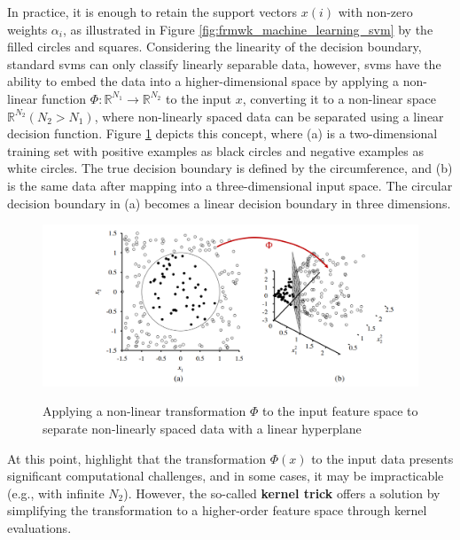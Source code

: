 In practice, it is enough to retain the support vectors $x(i)$ with non-zero weights $\alpha_i$, as illustrated in Figure \ref{fig:frmwk_machine_learning_svm} by the filled circles and squares. Considering the linearity of the decision boundary, standard \gls{svm}s can only classify linearly separable data, however, \gls{svm}s have the ability to embed the data into a higher-dimensional space by applying a non-linear function $\Phi: \mathbb{R}^{N_1} \rightarrow \mathbb{R}^{N_2}$ to the input $x$, converting it to a non-linear space $\mathbb{R}^{N_2} (N_2 > N_1)$, where non-linearly spaced data can be separated using a linear decision function. Figure \ref{fig:frmwk_machine_learning_svm_kernel_trick} depicts this concept, where (a) is a two-dimensional training set with positive examples as black circles and negative examples as white circles. The true decision boundary is defined by the circumference, and (b) is the same data after mapping into a three-dimensional input space. The circular decision boundary in (a) becomes a linear decision boundary in three dimensions.

\begin{figure}[htbp]
    \raggedright
        \caption{Applying a non-linear transformation $\Phi$ to the input feature space to separate non-linearly spaced data with a linear hyperplane}
        \includegraphics[width=1\textwidth]{resources/images/030-theoretical_framework/Framework_machine_learning_SVM_kernel_trick.png}
        \label{fig:frmwk_machine_learning_svm_kernel_trick}
\end{figure}

At this point, \textcite{Russel2010} highlight that the transformation $\Phi(x)$ to the input data presents significant computational challenges, and in some cases, it may be impracticable (e.g., with infinite $N_2$). However, the so-called \textbf{kernel trick} offers a solution by simplifying the transformation to a higher-order feature space through kernel evaluations. 

